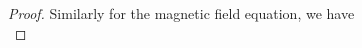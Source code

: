 \documentclass[11pt]{article}%
\numberwithin{equation}{section}
\def\grad{{\nabla}}
\def\nplushalf{{n+\frac12}}
\begin{document}
\begin{proof}
	Similarly for the magnetic field equation, we have
%	
%
%	
%
	\begin{equation}

\end{equation}
\end{proof}
\end{document}
